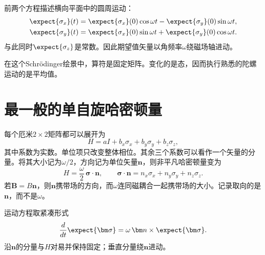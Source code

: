 前两个方程描述横向平面中的圆周运动：
\begin{align}
\expect{\sigma_x}(t)
&=\expect{\sigma_x}(0)\cos\omega t
-\expect{\sigma_y}(0)\sin\omega t,\\
\expect{\sigma_y}(t)
&=\expect{\sigma_x}(0)\sin\omega t
+\expect{\sigma_y}(0)\cos\omega t.
\end{align}
与此同时\(\expect{\sigma_z}\)是常数。因此期望值矢量以角频率\(\omega\)绕磁场轴进动。

在这个Schr\"odinger绘景中，算符是固定矩阵。变化的是态，因而执行熟悉的陀螺运动的是平均值。

\begin{classroomqa}
\end{classroomqa}

\section{最一般的单自旋哈密顿量}

每个厄米\(2\times2\)矩阵都可以展开为
\begin{equation}
H=aI+b_x\sigma_x+b_y\sigma_y+b_z\sigma_z,
\end{equation}
其中系数为实数。单位项只改变整体相位。其余三个系数可以看作一个矢量的分量。将其大小记为\(\omega/2\)，方向记为单位矢量\(\bm n\)，则非平凡哈密顿量变为
\begin{equation}
H=\frac{\omega}{2}\,\bm\sigma\cdot\bm n,
\qquad
\bm\sigma\cdot\bm n
=n_x\sigma_x+n_y\sigma_y+n_z\sigma_z.
\label{eq:l5-general-spin-h}
\end{equation}
若\(\bm B=B\bm n\)，则\(\bm n\)携带场的方向，而\(\omega\)连同磁耦合一起携带场的大小。记录取向的是\(\bm n\)，而不是\(\omega\)。

运动方程取紧凑形式
\begin{equation}
\frac{d}{dt}\expect{\bm\sigma}
=\omega\,\bm n\times\expect{\bm\sigma}.
\end{equation}
沿\(\bm n\)的分量与\(H\)对易并保持固定；垂直分量绕\(\bm n\)进动。

\begin{classroomqa}
\end{classroomqa}

